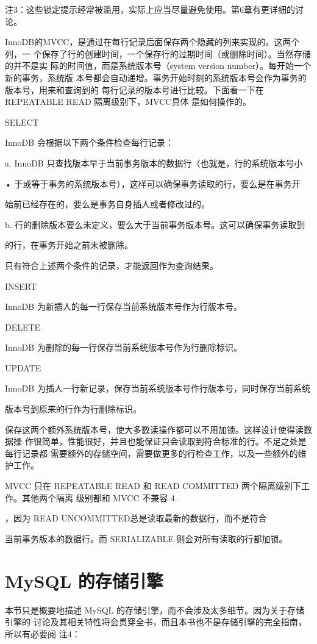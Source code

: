 注3：这些锁定提示经常被滥用，实际上应当尽量避免使用。第6章有更详细的讨论。

InnoDB的MVCC，是通过在每行记录后面保存两个隐藏的列来实现的。这两个列，一
个保存了行的创建时间，一个保存行的过期时间（或删除时间）。当然存储的并不是实
际的时间值，而是系统版本号（system version number）。每开始一个新的事务，系统版
本号都会自动递增。事务开始时刻的系统版本号会作为事务的版本号，用来和查询到的
每行记录的版本号进行比较。下面看一下在 REPEATABLE READ 隔离级别下，MVCC具体
是如何操作的。

SELECT

InnoDB 会根据以下两个条件检查每行记录：

a. InnoDB 只查找版本早于当前事务版本的数据行（也就是，行的系统版本号小

• 于或等于事务的系统版本号），这样可以确保事务读取的行，要么是在事务开

始前已经存在的，要么是事务自身插人或者修改过的。

b. 行的删除版本要么未定义，要么大于当前事务版本号。这可以确保事务读取到

的行，在事务开始之前未被删除。

只有符合上述两个条件的记录，才能返回作为查询结果。

INSERT

InnoDB 为新插人的每一行保存当前系统版本号作为行版本号。

DELETE

InnoDB 为删除的每一行保存当前系统版本号作为行删除标识。

UPDATE

InnoDB 为插人一行新记录，保存当前系统版本号作行版本号，同时保存当前系统

版本号到原来的行作为行删除标识。

保存这两个额外系统版本号，使大多数读操作都可以不用加锁。这样设计使得读数据操
作很简单，性能很好，并且也能保证只会读取到符合标准的行。不足之处是每行记录都
需要额外的存储空间，需要做更多的行检查工作，以及一些额外的维护工作。

MVCC 只在 REPEATABLE READ 和 READ COMMITTED 两个隔离级别下工作。其他两个隔离
级别都和 MVCC 不兼容 4.

，因为 READ UNCOMMITTED总是读取最新的数据行，而不是符合

当前事务版本的数据行。而 SERIALIZABLE 则会对所有读取的行都加锁。

\section{MySQL 的存储引擎}
本节只是概要地描述 MySQL 的存储引擎，而不会涉及太多细节。因为关于存储引擎的
讨论及其相关特性将会贯穿全书，而且本书也不是存储引擊的完全指南，所以有必要阅
注4：

